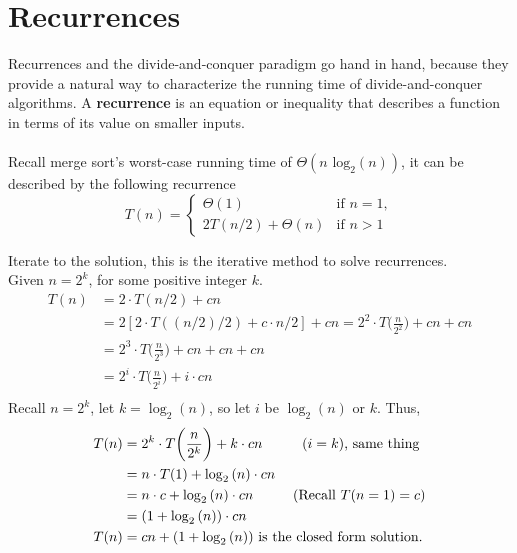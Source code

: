 \documentclass[12pt]{article}
\begin{document}
\section*{Recurrences}
Recurrences and the divide-and-conquer paradigm go hand in hand, because they provide a natural way to characterize the running time of divide-and-conquer algorithms. A \textbf{recurrence} is an equation or inequality that describes a function in terms of its value on smaller inputs. 
\\ \\
Recall merge sort's worst-case running time of $\Theta{(n\text{ log}_2(n))}$, it can be described by the following recurrence\\
$$
T(n)=
\begin{cases}
\Theta(1) & \text{if } n = 1,\\
2T(n/2) + \Theta{(n)} & \text{if } n > 1
\end{cases}
$$

Iterate to the solution, this is the iterative method to solve recurrences.\\
Given $n=2^k$, for some positive integer $k$.
\begin{equation*}
\begin{split}
  T(n) & = 2 \cdot T(n/2) + cn\\
  & = 2[2 \cdot T((n/2)/2) + c \cdot n/2] + cn = 2^2 \cdot T\bigg(\frac{n}{2^2}\bigg)+cn+cn\\
  & = 2^3 \cdot T\bigg(\frac{n}{2^3}\bigg)+cn+cn+cn\\
  & = 2^i \cdot T\bigg(\frac{n}{2^i}\bigg)+i \cdot cn\\
\end{split}
\end{equation*}
Recall $n=2^k$, let $k=\log_2{(n)}$, so let $i$ be $\log_2{(n)}$ or $k$. Thus,\\
\begin{equation*}
\begin{split}
  T(n) & = 2^k \cdot T\bigg(\frac{n}{2^k}\bigg) + k \cdot cn \text{\hspace{10mm}($i=k$), same thing}\\
  & = n \cdot T(1) + \log_2{(n)} \cdot cn\\
  & = n \cdot c + \log_2{(n)} \cdot cn \text{\hspace{10mm}(Recall $T(n=1) = c$)}\\
  & = (1 + \log_2{(n)}) \cdot cn\\
  T(n) & = cn + (1 + \log_2{(n)}) \text{ is the closed form solution.}
\end{split}
\end{equation*}
\end{document}

